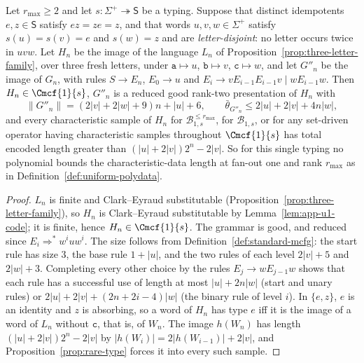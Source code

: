 \begin{corollary}
\label{cor:typing-level-obstruction}
Let $r_{\max}\ge2$ and let $s:\Sigma^+\twoheadrightarrow\mathsf S$ be a typing.
Suppose that distinct idempotents $e,z\in\mathsf S$ satisfy $ez=ze=z$, and that
words $u,v,w\in\Sigma^+$ satisfy $s(u)=s(v)=e$ and $s(w)=z$ and are
\emph{letter-disjoint}: no letter occurs twice in $uvw$.  Let $H_n$ be the image
of the language $L_n$ of Proposition~\ref{prop:three-letter-family}, over three
fresh letters, under $\mathtt a\mapsto u$, $\mathtt b\mapsto v$, $\mathtt c\mapsto w$,
and let $G''_n$ be the image of $G_n$, with rules $S\to E_n$, $E_0\to u$ and
$E_i\to vE_{i-1}E_{i-1}v\mid wE_{i-1}w$.  Then $H_n\in\Cmcf{1}{s}$, $G''_n$ is a
reduced good rank-two presentation of $H_n$ with
\[
 \|G''_n\|=(2|v|+2|w|+9)n+|u|+6,\qquad
 \bar\theta_{G''_n}\le2|u|+2|v|+4n|w|,
\]
and every characteristic sample of $H_n$ for $\mathcal B^{\le r_{\max}}_{1,s}$,
for $\mathcal B_{1,s}$, or for any set-driven operator having characteristic
samples throughout $\Cmcf{1}{s}$ has total encoded length greater than
$(|u|+2|v|)2^n-2|v|$.  So for this single typing no polynomial bounds the
characteristic-data length at fan-out one and rank $r_{\max}$ as in
Definition~\ref{def:uniform-polydata}.
\end{corollary}

\begin{proof}
$L_n$ is finite and Clark--Eyraud substitutable
(Proposition~\ref{prop:three-letter-family}), so $H_n$ is Clark--Eyraud
substitutable by Lemma~\ref{lem:app-u1-code}; it is finite, hence
$H_n\in\Cmcf{1}{s}$.  The grammar is good, and reduced since
$E_i\Rightarrow^*w^iuw^i$.  The size follows from
Definition~\ref{def:standard-mcfg}: the start rule has size $3$, the base rule
$1+|u|$, and the two rules of each level $2|v|+5$ and $2|w|+3$.  Completing every
other choice by the rules $E_j\to wE_{j-1}w$ shows that each rule has a
successful use of length at most $|u|+2n|w|$ (start and unary rules) or
$2|u|+2|v|+(2n+2i-4)|w|$ (the binary rule of level $i$).  In $\{e,z\}$, $e$ is an
identity and $z$ is absorbing, so a word of $H_n$ has type $e$ iff it is the
image of a word of $L_n$ without $\mathtt c$, that is, of $W_n$.  The image $h(W_n)$ has length
$(|u|+2|v|)2^n-2|v|$ by $|h(W_i)|=2|h(W_{i-1})|+2|v|$, and
Proposition~\ref{prop:rare-type} forces it into every such sample.
\end{proof}

